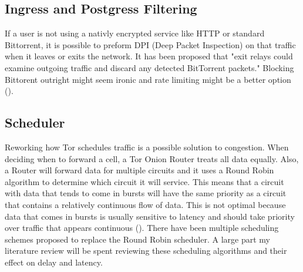 \documentclass[letterpaper,13pt]{texMemo}
\begin{document}
    \subsection*{Ingress and Postgress Filtering}
    If a user is not using a nativly encrypted service like HTTP or standard Bittorrent, it is
    possible to preform DPI (Deep Packet Inspection) on that traffic when it leaves or exits the
    network. It has been proposed that "exit relays could examine outgoing traffic and discard any
    detected BitTorrent packets." Blocking Bittorent outright might seem ironic and rate limiting
    might be a better option (\citeauthor[2]{Moore}).

    \subsection*{Scheduler}
    Reworking how Tor schedules traffic is a possible solution to congestion. When deciding when to
    forward a cell, a Tor Onion Router treats all data equally. Also, a Router will forward data for
    multiple circuits and it uses a Round Robin algorithm to determine which circuit it will
    service. This means that a circuit with data that tends to come in bursts will have the same
    priority as a circuit that contains a relatively continuous flow of data. This is not optimal
    because data that comes in bursts is usually sensitive to latency and should take priority over
    traffic that appears continuous (\citeauthor[2]{unfair}). There have been multiple scheduling
    schemes proposed to replace the Round Robin scheduler. A large part my literature review will be
    spent reviewing these scheduling algorithms and their effect on delay and latency.
\end{document}
